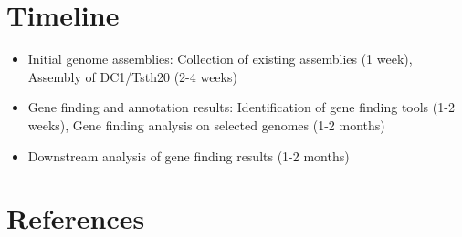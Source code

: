 \documentclass[12pt]{article}
\begin{document}
\section{Timeline}
\begin{itemize}
\item Initial genome assemblies: Collection of existing assemblies (1 week), Assembly of DC1/Tsth20 (2-4 weeks)
\item Gene finding and annotation results: Identification of gene finding tools (1-2 weeks), Gene finding analysis on selected genomes (1-2 months)
\item Downstream analysis of gene finding results (1-2 months)
\end{itemize}

\section{References}
\end{document}

